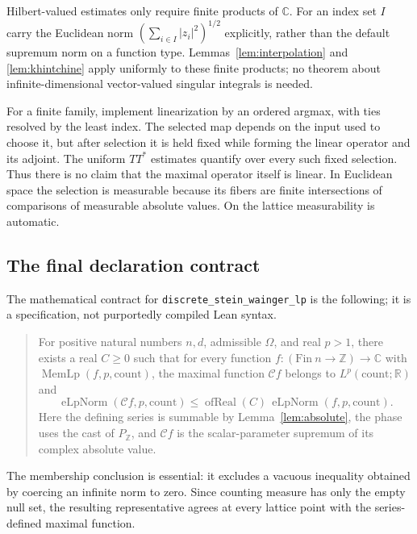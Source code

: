 \documentclass[11pt,oneside]{article}
\theoremstyle{definition}\newtheorem{definition}[theorem]{Definition}
\theoremstyle{remark}\newtheorem{remark}[theorem]{Remark}
\newcommand{\R}{\mathbb R}\newcommand{\Z}{\mathbb Z}\newcommand{\N}{\mathbb N}\newcommand{\Q}{\mathbb Q}\newcommand{\C}{\mathbb C}\newcommand{\T}{\mathbb T}
\newcommand{\ml}[1]{{\normalfont\small\nolinkurl{#1}}}
\begin{document}
Hilbert-valued estimates only require finite products of $\C$. For an
index set $I$ carry the Euclidean norm
$(\sum_{i\in I}|z_i|^2)^{1/2}$ explicitly, rather than the default supremum
norm on a function type. Lemmas~\ref{lem:interpolation} and
\ref{lem:khintchine} apply uniformly to these finite products; no theorem
about infinite-dimensional vector-valued singular integrals is needed.

For a finite family, implement linearization by an ordered argmax, with ties
resolved by the least index. The selected map depends on the input used to
choose it, but after selection it is held fixed while forming the linear
operator and its adjoint. The uniform $TT^*$ estimates quantify over every
such fixed selection. Thus there is no claim that the maximal operator
itself is linear. In Euclidean space the selection is measurable because its
fibers are finite intersections of comparisons of measurable absolute values.
On the lattice measurability is automatic.

\subsection{The final declaration contract}
The mathematical contract for \ml{discrete_stein_wainger_lp} is the following;
it is a specification, not purportedly compiled Lean syntax.
\begin{quote}
For positive natural numbers $n,d$, admissible $\Omega$, and real $p>1$,
there exists a real $C\geq0$ such that for every function
$f:(\mathrm{Fin}\ n\to\Z)\to\C$ with $\operatorname{MemLp}(f,p,\mathrm{count})$,
the maximal function $\mathcal C f$ belongs to
$L^p(\mathrm{count};\R)$ and
\[
 \operatorname{eLpNorm}(\mathcal C f,p,\mathrm{count})
 \leq \operatorname{ofReal}(C)\,
                   \operatorname{eLpNorm}(f,p,\mathrm{count}).
\]
Here the defining series is summable by Lemma~\ref{lem:absolute}, the phase
uses the cast of $P_\Z$, and $\mathcal C f$ is the scalar-parameter supremum
of its complex absolute value.
\end{quote}
The membership conclusion is essential: it excludes a vacuous inequality
obtained by coercing an infinite norm to zero. Since counting measure has
only the empty null set, the resulting representative agrees at every
lattice point with the series-defined maximal function.
\end{document}
